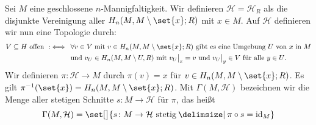 \begin{definition}[{name=[{Disjunkte Vereinigung der Homologieklassen}]}]
	Sei $M$ eine geschlossene $n$-Mannigfaltigkeit. 
	Wir definieren $\mathcal{H}=\mathcal{H}_R$ als die disjunkte Vereinigung aller $H_n(M,M\setminus \set{x};R)$ mit $x \in M$. 
	Auf $\mathcal{H}$ definieren wir nun eine Topologie  durch:
	\begin{align*}
		V \subseteq H \text{ offen } :\iff \enspace& \forall v \in V \text{ mit } v \in H_n(M,M \setminus \set{x};R) \text{ gibt es eine Umgebung $U$ von $x$ in $M$}\\
		&\text{und $v_U \in H_n(M,M \setminus U,R)$ mit } v_U\big|_x=v \text{ und } v_U\big|_y \in V \text{ für alle $y \in U$.}
	\end{align*}
	Wir definieren $\pi \colon \mathcal{H} \to M$ durch $\pi(v)=x$ für $v \in H_n(M,M \setminus \set{x};R)$. 
	Es gilt $\pi ^{-1}(\set{x})= H_n(M,M \setminus \set{x};R)$.
	Mit $\Gamma(M,\mathcal{H})$ bezeichnen wir die Menge aller stetigen Schnitte $s\colon M \to \mathcal{H}$ für $\pi$, das heißt 
	\[
		\Gamma(M,\mathcal{H})= \set[\big]{s \colon M \to \mathcal{H} \text{ stetig} \given \pi  \circ s =\id_M} 
	\]
\end{definition}

